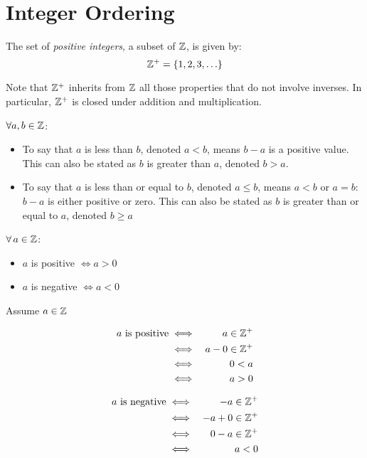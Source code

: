 \documentclass[letterpaper,12pt,fleqn]{article}
\begin{document}
\section*{Integer Ordering}

\begin{definition}
  The set of \emph{positive integers}, a subset of $\mathbb{Z}$, is given by:
  \[\mathbb{Z}^+=\{1,2,3,\ldots\}\]
\end{definition}

Note that $\mathbb{Z}^+$ inherits from $\mathbb{Z}$ all those properties that do not involve
inverses. In particular, $\mathbb{Z}^+$ is closed under addition and multiplication.

\begin{definition}
  $\forall a,b\in\mathbb{Z}$:
  \begin{itemize}
  \item To say that $a$ is less than $b$, denoted $a<b$, means $b-a$ is a
    positive value. This can also be stated as $b$ is greater than $a$,
    denoted $b>a$.

  \item To say that $a$ is less than or equal to $b$, denoted $a\le b$, means
    $a<b$ or $a=b$: $b-a$ is either positive or zero. This can also be stated
    as $b$ is greater than or equal to $a$, denoted $b\ge a$
  \end{itemize}
\end{definition}

\begin{theorem}
  $\forall\,a\in\mathbb{Z}$:
  \begin{itemize}
    \item $a$ is positive $\iff a>0$
    \item $a$ is negative $\iff a<0$
  \end{itemize}
\end{theorem}

\begin{theproof}
  Assume $a\in\mathbb{Z}$
  
  \begin{minipage}{3in}
    \begin{eqnarray*}
      a\ \mbox{is positive} &\iff& a\in\mathbb{Z}^+ \\
      &\iff& a-0\in\mathbb{Z}^+ \\
      &\iff& 0<a \\
      &\iff& a>0 \\
    \end{eqnarray*}
  \end{minipage}
  \begin{minipage}{3in}
    \begin{eqnarray*}
      a\ \mbox{is negative} &\iff& -a\in\mathbb{Z}^+ \\
      &\iff& -a+0\in\mathbb{Z}^+ \\
      &\iff& 0-a\in\mathbb{Z}^+ \\
      &\iff& a<0 \\
    \end{eqnarray*}
  \end{minipage}
\end{theproof}
\end{document}

